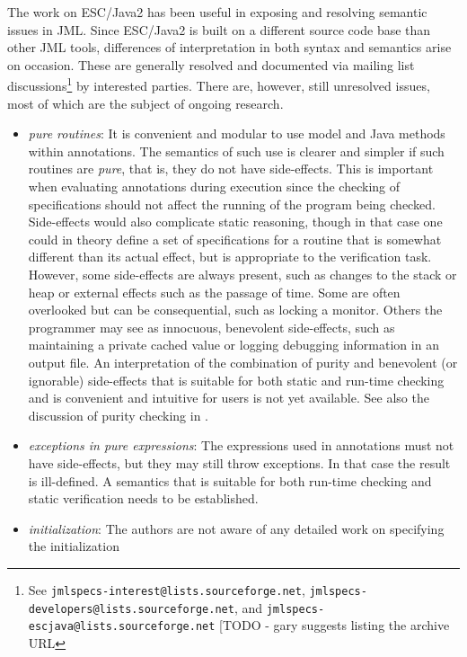 \documentclass{sig-alternate}
\begin{document}
The work on ESC/Java2 has been useful in exposing and resolving
semantic issues in JML.  Since ESC/Java2 is built on a different
source code base than other JML tools, differences of interpretation
in both syntax and semantics arise on occasion.  These are generally
resolved and documented via mailing list discussions\footnote{See \texttt{jmlspecs-interest@lists.sourceforge.net}, 
\texttt{jmlspecs-developers@lists.sourceforge.net}, and
\texttt{jmlspecs-escjava@lists.sourceforge.net} [TODO - gary suggests listing the archive URL}
by interested
parties.  There are, however, still unresolved issues, most of which
are the subject of ongoing research.
\setlength{\partopsep}{0in}\setlength{\parskip}{0in}\setlength{\itemsep}{0in}\setlength{\topsep}{0in}
\begin{itemize}
\setlength{\partopsep}{0in}\setlength{\parskip}{0in}\setlength{\itemsep}{0in}\setlength{\topsep}{0in}
\item \textit{pure routines}:  It is convenient and modular to use model and Java methods within
annotations.  The semantics of such use is clearer and simpler if such routines are {\em pure}, that is, they do not have side-effects.  This is important when evaluating annotations during
execution since the checking of specifications should not affect the running of the program being
checked.  Side-effects would also complicate static reasoning, though in that case one could 
in theory define a set of specifications for a routine that is somewhat different than its actual effect, but is
appropriate to the verification task.   However, some side-effects are
always present, such as changes to the stack or heap or external effects such as the passage of time.  Some are often overlooked but can be consequential, such as locking a monitor. 
 Others the programmer may
see as innocuous, benevolent side-effects, such as maintaining a private cached value or logging debugging information in an output file.
An interpretation of the combination of purity and benevolent (or ignorable)
  side-effects that is suitable for both static and run-time checking and is convenient and intuitive
for users is not yet available. See also the discussion of purity checking in \cite{Leavens-etal03a}.
\item \textit{exceptions in pure expressions}:  The expressions used in annotations must not have
side-effects, but they may still throw exceptions.  In that case the result is ill-defined.  A
semantics that is suitable for both run-time checking and static verification needs to be 
established.
\item \textit{initialization}:  The authors are not aware of any detailed work on specifying the initialization

\end{itemize}
\end{document}
